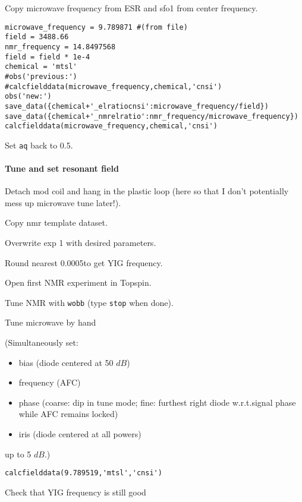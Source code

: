 Copy microwave frequency from ESR and sfo1 from center frequency.  


\begin{lstlisting}
microwave_frequency = 9.789871 #(from file)
field = 3488.66
nmr_frequency = 14.8497568
field = field * 1e-4
chemical = 'mtsl'
#obs('previous:')
#calcfielddata(microwave_frequency,chemical,'cnsi')
obs('new:')
save_data({chemical+'_elratiocnsi':microwave_frequency/field})
save_data({chemical+'_nmrelratio':nmr_frequency/microwave_frequency})
calcfielddata(microwave_frequency,chemical,'cnsi')
\end{lstlisting}


Set \texttt{aq} back to 0.5.

\paragraph{Tune and set resonant field}
Detach mod coil and hang in the plastic loop (here so that I don't potentially mess up microwave tune later!).

Copy nmr template dataset.

Overwrite exp 1 with desired parameters.

Round nearest 0.0005\GHz to get YIG frequency.

Open first NMR experiment in Topspin.

Tune NMR with {\tt wobb} (type {\tt stop} when done).


Tune microwave by hand
{\small (Simultaneously set:
\begin{itemize}
    \item bias (diode centered at 50 $dB$)
    \item frequency (AFC)
    \item phase (coarse: dip in tune mode; fine: furthest right diode w.r.t.signal phase while AFC remains locked)
    \item iris (diode centered at all powers) 
\end{itemize}
up to 5 $dB$.)}
\begin{lstlisting}
calcfielddata(9.789519,'mtsl','cnsi')
\end{lstlisting}

Check that YIG frequency is still good

